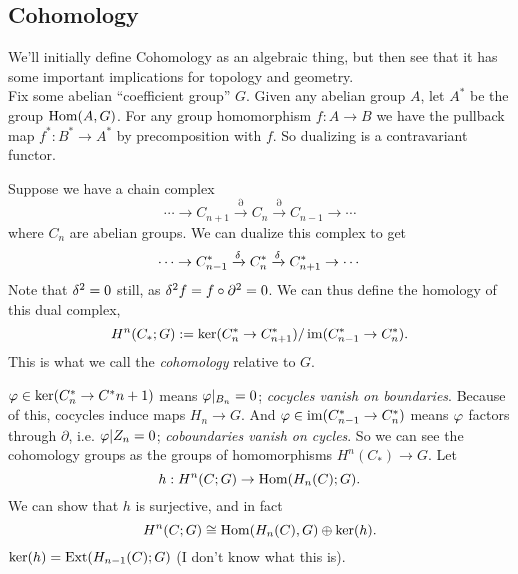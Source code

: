\documentclass{amsart}
\begin{document}
	\subsection{Cohomology} We'll initially define Cohomology as an algebraic thing, but then see that it has some important implications for topology and geometry. \\
	
	Fix some abelian ``coefficient group'' $G$. Given any abelian group $A$, let $A^*$ be the group $\operatorname{Hom}(A,G)$. For any group homomorphism $f:A\to B$ we have the pullback map $f^*:B^*\to A^*$ by precomposition with $f$. So dualizing is a contravariant functor.
	
	Suppose we have a chain complex
	$$
	\cdots \to C_{n+1} \xrightarrow{\partial} C_n \xrightarrow{\partial} C_{n-1}\to \cdots 
	$$
	where $C_n$ are abelian groups. We can dualize this complex to get 
	$$
	\cdots \to C^*_{n-1} \xrightarrow{\delta} C^*_n \xrightarrow{\delta} C^*_{n+1}\to \cdots 
	$$
	Note that $\delta^2=0$ still, as $\delta^2 f = f \circ \partial^2 = 0$. We can thus define the homology of this dual complex,
	$$
	H^n(C_*;G) := \ker(C_n^*\to C_{n+1}^*) / \operatorname{im}(C_{n-1}^*\to C_n^*).
	$$
	This is what we call the \textit{cohomology} relative to $G$.
	
	$\varphi\in \ker(C_n^*\to C^*{n+1})$ means $\varphi|_{B_n}=0$; \textit{cocycles vanish on boundaries}. Because of this, cocycles induce maps $H_n\to G$. And $\varphi\in \operatorname{im}(C_{n-1}^*\to C_n^*)$ means $\varphi$ factors through $\partial$, i.e. $\varphi|{Z_n}=0$; \textit{coboundaries vanish on cycles}. So we can see the cohomology groups as the groups of homomorphisms $H^n(C_*)\to G$. Let
	$$
	h:H^n(C;G)\to \operatorname{Hom}(H_n(C);G).
	$$ 
	We can show that $h$ is surjective, and in fact
	$$
	H^n(C;G) \cong \operatorname{Hom}(H_n(C),G) \oplus \ker(h).
	$$
	$\ker(h) = \operatorname{Ext}(H_{n-1}(C);G)$ (I don't know what this is).
	
\end{document}

